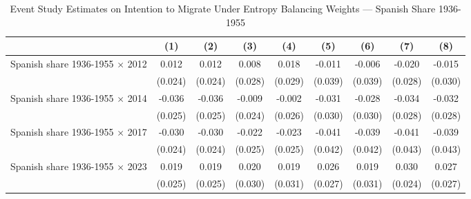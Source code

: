 \begin{table}
\caption{Event Study Estimates on Intention to Migrate Under Entropy Balancing Weights — Spanish Share 1936-1955}
\renewcommand{\arraystretch}{1.25}
\centering
\begin{tabular}[t]{lcccccccc}
\hline
  & (1) & (2) & (3) & (4) & (5) & (6) & (7) & (8)\\
\hline
Spanish share 1936-1955 $\times$ 2012 & 0.012 & 0.012 & 0.008 & 0.018 & -0.011 & -0.006 & -0.020 & -0.015\\
 & (0.024) & (0.024) & (0.028) & (0.029) & (0.039) & (0.039) & (0.028) & (0.030)\\
Spanish share 1936-1955 $\times$ 2014 & -0.036 & -0.036 & -0.009 & -0.002 & -0.031 & -0.028 & -0.034 & -0.032\\
 & (0.025) & (0.025) & (0.024) & (0.026) & (0.030) & (0.030) & (0.028) & (0.028)\\
Spanish share 1936-1955 $\times$ 2017 & -0.030 & -0.030 & -0.022 & -0.023 & -0.041 & -0.039 & -0.041 & -0.039\\
 & (0.024) & (0.024) & (0.025) & (0.025) & (0.042) & (0.042) & (0.043) & (0.043)\\
Spanish share 1936-1955 $\times$ 2023 & 0.019 & 0.019 & 0.020 & 0.019 & 0.026 & 0.019 & 0.030 & 0.027\\
 & (0.025) & (0.025) & (0.030) & (0.031) & (0.027) & (0.031) & (0.024) & (0.027)\\


\end{tabular}
\end{table}
